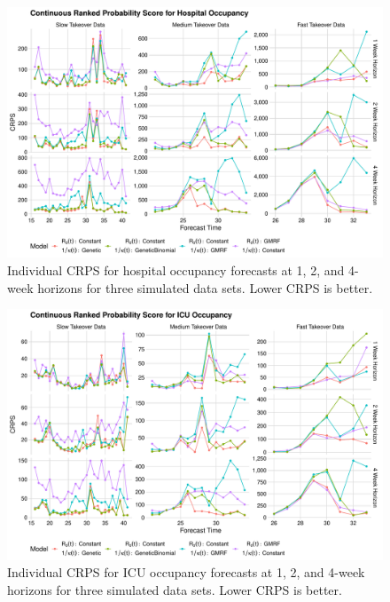 \begin{figure}
    \centering
    \includegraphics[width=1.0\columnwidth]{simulated_crps_comparison_data_hospitalizations_plot}
    \caption{Individual CRPS for hospital occupancy forecasts at 1, 2, and 4-week horizons for three simulated data sets. Lower CRPS is better.}
    \label{ch_5:fig:simulated_crps_comparison_data_hospitalizations_plot}
\end{figure}

\begin{figure}
    \centering
    \includegraphics[width=1.0\columnwidth]{simulated_crps_comparison_data_icu_plot}
    \caption{Individual CRPS for ICU occupancy forecasts at 1, 2, and 4-week horizons for three simulated data sets. Lower CRPS is better.}
    \label{ch_5:fig:simulated_crps_comparison_data_icu_plot}
\end{figure}

